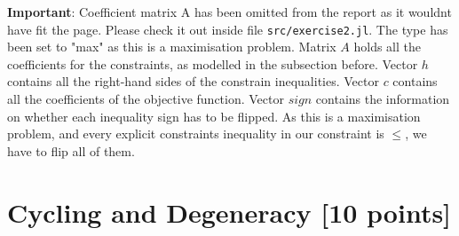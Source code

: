 \documentclass[unicode,11pt,a4paper,oneside,numbers=endperiod,openany]{scrartcl}
\begin{document}



\textbf{Important}: Coefficient matrix A has been omitted from the report as it wouldnt have fit the page. Please check it out inside file \verb|src/exercise2.jl|.
The type has been set to "max" as this is a maximisation problem.
Matrix $A$ holds all the coefficients for the constraints, as modelled in the subsection before.
Vector $h$ contains all the right-hand sides of the constrain inequalities.
Vector $c$ contains all the coefficients of the objective function.
Vector $sign$ contains the information on whether each inequality sign has to be flipped. As this is a maximisation problem, and every explicit constraints inequality in our constraint is $\leq$, we have to flip all of them. 






\section{Cycling and Degeneracy [10 points]}
\end{document}
